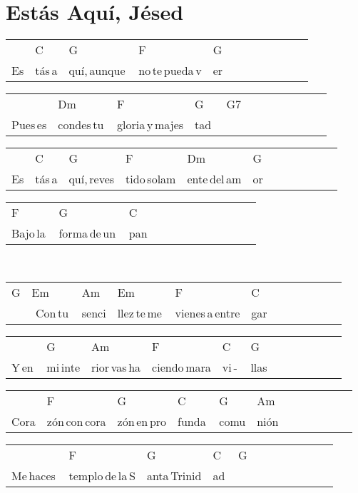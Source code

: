 \section*{Estás Aquí, Jésed\hfill}
\begin{multicols}{2}
\noindent
\begin{minipage}{\columnwidth}
\noindent
\noindent
\begin{tabular}{llllllllllll}
&C&G&F&G\\
Es&tás\,a&quí,\,aunque\,&no\,te\,pueda\,v&er
\end{tabular}

\noindent
\begin{tabular}{llllllllllll}
&Dm&F&G&G7\\
Pues\,es&condes\,tu\,&gloria\,y\,majes&tad\,\,&
\end{tabular}

\noindent
\begin{tabular}{llllllllllll}
&C&G&F&Dm&G\\
Es&tás\,a&quí,\,reves&tido\,solam&ente\,del\,am&or
\end{tabular}

\noindent
\begin{tabular}{llllllllllll}
F&G&C\\
Bajo\,la\,&forma\,de\,un\,&pan
\end{tabular}
\end{minipage}\\

\noindent
\begin{minipage}{\columnwidth}
\noindent
\noindent
\begin{tabular}{llllllllllll}
G&Em&Am&Em&F&C\\
\quad\,\,&\,\,Con\,tu\,&senci&llez\,te\,me\,&vienes\,a\,entre&gar
\end{tabular}

\noindent
\begin{tabular}{llllllllllll}
&G&Am&F&C&G\\
Y\,en\,&mi\,inte&rior\,vas\,ha&ciendo\,mara&vi\,-\,&llas
\end{tabular}

\noindent
\begin{tabular}{llllllllllll}
&F&G&C&G&Am\\
Cora&zón\,con\,cora&zón\,en\,pro&funda\,&comu&nión
\end{tabular}

\noindent
\begin{tabular}{llllllllllll}
&F&G&C&G\\
Me\,haces\,&templo\,de\,la\,S&anta\,Trinid&ad\,&
\end{tabular}
\end{minipage}\\


\end{multicols}

